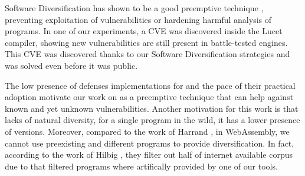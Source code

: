 Software Diversification has shown to be a good preemptive technique \citationneeded, preventing exploitation of vulnerabilities or hardening harmful analysis of programs. In one of our experiments, a CVE was discovered inside the Lucet compiler, showing new vulnerabilities are still present in battle-tested engines. This CVE was discovered thanks to our Software Diversification strategies and was solved even before it was public. 






The low presence of defenses implementations for \wasm and the pace of their practical adoption motivate our work on as a preemptive technique that can help against known and yet unknown vulnerabilities.
Another motivation for this work is that \wasm lacks of natural diversity, \ie for a single \wasm program in the wild, it has a lower presence of versions. Moreover, compared to the work of Harrand \etal \cite{Harrand1650630}, in WebAssembly, we cannot use preexisting and different programs to provide diversification. In fact, according to the work of Hilbig \etal \cite{Hilbig2021AnES}, they filter out half of internet available \wasm corpus due to that filtered programs where artifically provided by one of our tools. 








